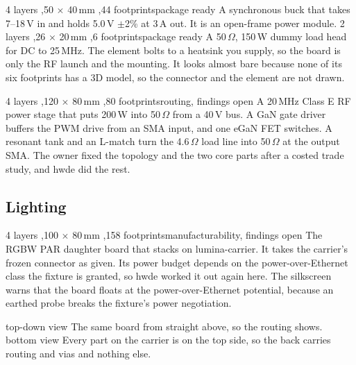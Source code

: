 \boardpair
{%
{4 layers \sep 50 $\times$ 40\,mm \sep 44 footprints}{package ready}%
{A synchronous buck that takes 7--18\,V in and holds 5.0\,V $\pm$2\% at 3\,A
out. It is an open-frame power module.}}
{%
{2 layers \sep 26 $\times$ 20\,mm \sep 6 footprints}{package ready}%
{A 50\,$\Omega$, 150\,W dummy load head for DC to 25\,MHz. The element bolts to
a heatsink you supply, so the board is only the RF launch and the mounting. It
looks almost bare because none of its six footprints has a 3D model, so the
connector and the element are not drawn.}}

\newpage

%
{4 layers \sep 120 $\times$ 80\,mm \sep 80 footprints}{routing, findings open}%
{A 20\,MHz Class E RF power stage that puts 200\,W into 50\,$\Omega$ from a
40\,V bus. A GaN gate driver buffers the PWM drive from an SMA input, and one
eGaN FET switches. A resonant tank and an L-match turn the 4.6\,$\Omega$ load
line into 50\,$\Omega$ at the output SMA. The owner fixed the topology and the
two core parts after a costed trade study, and hwde did the rest.}

\newpage

\subsection{Lighting}

\setlength{\boardh}{6cm}
%
{4 layers \sep 100 $\times$ 80\,mm \sep 158 footprints}{manufacturability, findings open}%
{The RGBW PAR daughter board that stacks on lumina-carrier. It takes the
carrier's frozen connector as given. Its power budget depends on the
power-over-Ethernet class the fixture is granted, so hwde worked it out again
here. The silkscreen warns that the board floats at the power-over-Ethernet
potential, because an earthed probe breaks the fixture's power negotiation.}
\setlength{\boardh}{9cm}

\boardpair
{%
{top-down view}{}%
{The same board from straight above, so the routing shows.}}
{%
{bottom view}{}%
{Every part on the carrier is on the top side, so the back carries routing and
vias and nothing else.}}

